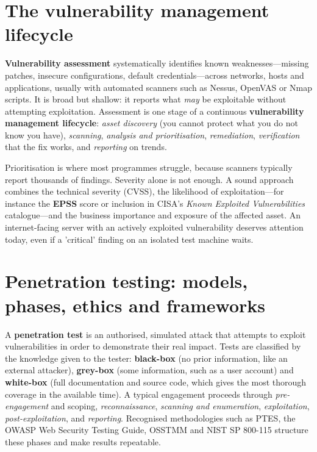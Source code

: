 \documentclass[11pt,openany]{book}
\begin{document}
\section{The vulnerability management lifecycle}\label{sec:10.3}
\textbf{Vulnerability assessment} systematically identifies known weaknesses—missing patches, insecure configurations, default credentials—across networks, hosts and applications, usually with automated scanners such as Nessus, OpenVAS or Nmap scripts. It is broad but shallow: it reports what \emph{may} be exploitable without attempting exploitation. Assessment is one stage of a continuous \textbf{vulnerability management lifecycle}: \emph{asset discovery} (you cannot protect what you do not know you have), \emph{scanning}, \emph{analysis and prioritisation}, \emph{remediation}, \emph{verification} that the fix works, and \emph{reporting} on trends.

Prioritisation is where most programmes struggle, because scanners typically report thousands of findings. Severity alone is not enough. A sound approach combines the technical severity (CVSS), the likelihood of exploitation—for instance the \textbf{EPSS} score or inclusion in CISA's \emph{Known Exploited Vulnerabilities} catalogue—and the business importance and exposure of the affected asset. An internet-facing server with an actively exploited vulnerability deserves attention today, even if a 'critical' finding on an isolated test machine waits.

\section{Penetration testing: models, phases, ethics and frameworks}\label{sec:10.4}
A \textbf{penetration test} is an authorised, simulated attack that attempts to exploit vulnerabilities in order to demonstrate their real impact. Tests are classified by the knowledge given to the tester: \textbf{black-box} (no prior information, like an external attacker), \textbf{grey-box} (some information, such as a user account) and \textbf{white-box} (full documentation and source code, which gives the most thorough coverage in the available time). A typical engagement proceeds through \emph{pre-engagement} and scoping, \emph{reconnaissance}, \emph{scanning and enumeration}, \emph{exploitation}, \emph{post-exploitation}, and \emph{reporting}. Recognised methodologies such as PTES, the OWASP Web Security Testing Guide, OSSTMM and NIST SP 800-115 structure these phases and make results repeatable.
\end{document}
